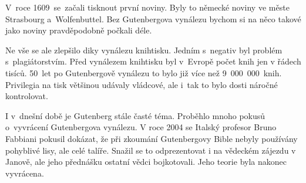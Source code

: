 \documentclass[a4paper, 11pt]{article}
\begin{document}
	V~roce 1609~se~začali tisknout první noviny. Byly to německé noviny ve měste Strasbourg a~Wolfenbuttel. Bez Gutenbergova vynálezu bychom si na něco takové jako noviny pravděpodobně počkali déle. ~\cite{HemingNelson} 

	Ne vše se ale zlepšilo diky vynálezu knihtisku. Jedním s~negativ byl problém s~plagiátorstvím. Před vynálezem knihtisku byl v~Evropě počet knih jen v řádech tisíců. 50~let po Gutenbergově vynálezu to bylo již více než 9~000~000~knih. Privilegia na tisk většinou udávaly vládcové, ale i~tak to bylo dosti náročné kontrolovat. ~\cite{BarboraTvrdonova}

	I v~dnešní době je Gutenberg stále časté téma. Proběhlo mnoho pokusů o~vyvrácení Gutenbergova vynálezu. V roce 2004 se Italský profesor Bruno Fabbiani pokusil dokázat, že při zkoumání Gutenbergovy Bible nebyly používány pohyblivé lisy, ale celé talíře. Snažil se to odprezentovat i na vědeckém zájezdu v Janově, ale jeho přednášku ostatní vědci bojkotovali. Jeho teorie byla nakonec vyvrácena. ~\cite{JamesClough}

	\pagebreak

	
	
\end{document}
